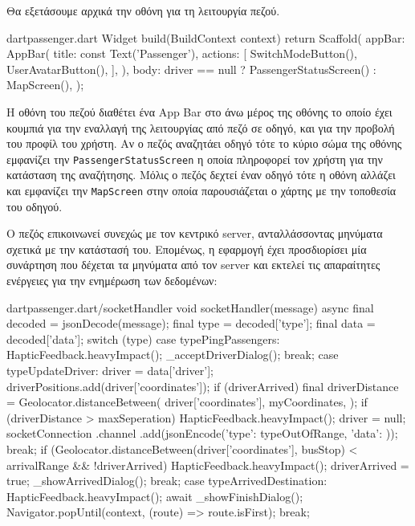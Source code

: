 \documentclass[../thesis.tex]{subfiles}
\begin{document}
Θα εξετάσουμε αρχικά την οθόνη για τη λειτουργία πεζού.

\begin{codeblock}{dart}{passenger.dart}
  Widget build(BuildContext context) {
    return Scaffold(
      appBar: AppBar(
        title: const Text('Passenger'),
        actions: [
          SwitchModeButton(),
          UserAvatarButton(),
        ],
      ),
      body: driver == null
          ? PassengerStatusScreen()
          : MapScreen(),
    );
  }
\end{codeblock}

Η οθόνη του πεζού διαθέτει ένα App Bar στο άνω μέρος της οθόνης το οποίο έχει κουμπιά για την εναλλαγή της λειτουργίας από πεζό σε οδηγό, και για την προβολή του προφίλ του χρήστη.
Αν ο πεζός αναζητάει οδηγό τότε το κύριο σώμα της οθόνης εμφανίζει την \texttt{PassengerStatusScreen} η οποία πληροφορεί τον χρήστη για την κατάσταση της αναζήτησης.
Μόλις ο πεζός δεχτεί έναν οδηγό τότε η οθόνη αλλάζει και εμφανίζει την \texttt{MapScreen} στην οποία παρουσιάζεται ο χάρτης με την τοποθεσία του οδηγού.

Ο πεζός επικοινωνεί συνεχώς με τον κεντρικό server, ανταλλάσσοντας μηνύματα σχετικά με την κατάστασή του.
Επομένως, η εφαρμογή έχει προσδιορίσει μία συνάρτηση που δέχεται τα μηνύματα από τον server και εκτελεί τις απαραίτητες ενέργειες για την ενημέρωση των δεδομένων:

\begin{codeblock}{dart}{passenger.dart/socketHandler}
  void socketHandler(message) async {
    final decoded = jsonDecode(message);
    final type = decoded['type'];
    final data = decoded['data'];
    switch (type) {
      case typePingPassengers:
        HapticFeedback.heavyImpact();
        _acceptDriverDialog();
        break;
      case typeUpdateDriver:
        driver = data['driver'];
        driverPositions.add(driver['coordinates']);
        if (driverArrived) {
          final driverDistance = Geolocator.distanceBetween(
            driver['coordinates'],
            myCoordinates,
          );
          if (driverDistance > maxSeperation) {
            HapticFeedback.heavyImpact();
            driver = null;
            socketConnection
              .channel
              .add(jsonEncode({'type': typeOutOfRange, 'data': {}}));
            break;
          }
        }
        if (Geolocator.distanceBetween(driver['coordinates'], busStop) < 
        arrivalRange && !driverArrived) {
          HapticFeedback.heavyImpact();
          driverArrived = true;
          _showArrivedDialog();
        }
        break;
      case typeArrivedDestination:
        HapticFeedback.heavyImpact();
        await _showFinishDialog();
        Navigator.popUntil(context, (route) => route.isFirst);
        break;
    }
  }
\end{codeblock}
\end{document}
